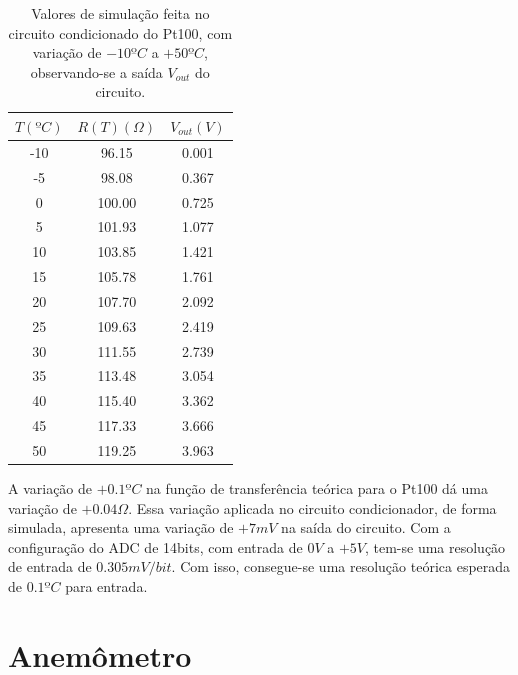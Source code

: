 \documentclass[a4paper]{instrumentacao}
\begin{document}
\begin{table}[H]
\centering
\caption{Valores de simulação feita no circuito condicionado do Pt100, com variação de $-10ºC$ a $+50ºC$, observando-se a saída $V_{out}$ do circuito.}
\label{tab:pt100-simulacao-ckt-condicionador}
\begin{tabular}{|c|c|c|}
\hline
\textbf{$T (ºC)$} & \textbf{$R(T)(\Omega)$} & \textbf{$V_{out} (V)$} \\ \hline
-10             & 96.15         & 0.001               \\ \hline
-5              & 98.08         & 0.367               \\ \hline
0               & 100.00        & 0.725               \\ \hline
5               & 101.93        & 1.077               \\ \hline
10              & 103.85        & 1.421               \\ \hline
15              & 105.78        & 1.761               \\ \hline
20              & 107.70        & 2.092               \\ \hline
25              & 109.63        & 2.419               \\ \hline
30              & 111.55        & 2.739               \\ \hline
35              & 113.48        & 3.054               \\ \hline
40              & 115.40        & 3.362               \\ \hline
45              & 117.33        & 3.666               \\ \hline
50              & 119.25        & 3.963               \\ \hline
\end{tabular}
\end{table}

A variação de $+0.1ºC$ na função de transferência teórica para o Pt100 dá uma variação de $+0.04\Omega$. Essa variação aplicada no circuito condicionador, de forma simulada, apresenta uma variação de $+7mV$ na saída do circuito. Com a configuração do ADC de 14bits, com entrada de $0V$ a $+5V$, tem-se uma resolução de entrada de $0.305mV/bit$. Com isso, consegue-se uma resolução teórica esperada de $0.1ºC$ para entrada.

\section{Anemômetro}
\end{document}
